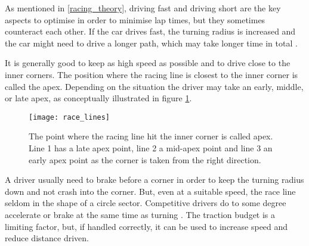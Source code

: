 


As mentioned in \ref{racing_theory}, driving fast and driving short are the key aspects to optimise in order to minimise lap times, but they sometimes counteract each other. If the car drives fast, the turning radius is increased and the car might need to drive a longer path, which may take longer time in total \cite{edmondson}. 

It is generally good to keep as high speed as possible and to drive close to the inner corners. The position where the racing line is closest to the inner corner is called the apex. Depending on the situation the driver may take an early, middle, or late apex, as conceptually illustrated in figure \ref{figure:apex_variants}.

\begin{figure}[H]
    \centering
    \texttt{[image: race\_lines]}
    \caption{The point where the racing line hit the inner corner is called apex. Line 1 has a late apex point, line 2 a mid-apex point and line 3 an early apex point as the corner is taken from the right direction.}
    \label{figure:apex_variants}
\end{figure}

\noindent
A driver usually need to brake before a corner in order to keep the turning radius down and not crash into the corner. But, even at a suitable speed, the race line seldom in the shape of a circle sector. Competitive drivers do to some degree accelerate or brake at the same time as turning \cite{edmondson}. The traction budget is a limiting factor, but, if handled correctly, it can be used to increase speed and reduce distance driven. 

